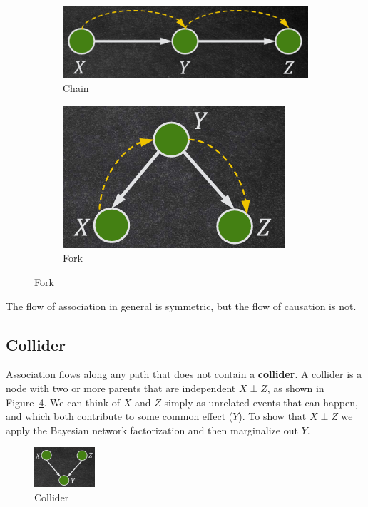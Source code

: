 \begin{figure}[!ht]
    \centering
    \begin{subfigure}[b]{0.45\textwidth}
        \includegraphics[width=\textwidth]{img/flow/chain.png}
        \caption{Chain}
        \label{fig:chain}
    \end{subfigure}
    \hfill
    \begin{subfigure}[b]{0.45\textwidth}
        \includegraphics[scale=0.5]{img/flow/fork.png}
        \caption{Fork}
        \label{fig:fork}
    \end{subfigure}
\end{figure}

\begin{note}
    The flow of association in general is symmetric, but the flow of causation
    is not.
\end{note}
\subsection{Collider}
Association flows along any path that does not contain a \textbf{collider}. A
collider is a node with two or more parents that are independent $X \perp Z$, as
shown in Figure~\ref{fig:collider}. We can think of $X$ and $Z$ simply as unrelated
events that can happen, and which both contribute to some common effect ($Y$).
To show that $X \perp Z$ we apply the Bayesian network factorization and then
marginalize out $Y$.

\begin{figure}[!ht]
    \centering
    \includegraphics[width=0.2\textwidth]{img/flow/collider.png}
    \caption{Collider}
    \label{fig:collider}
\end{figure}

